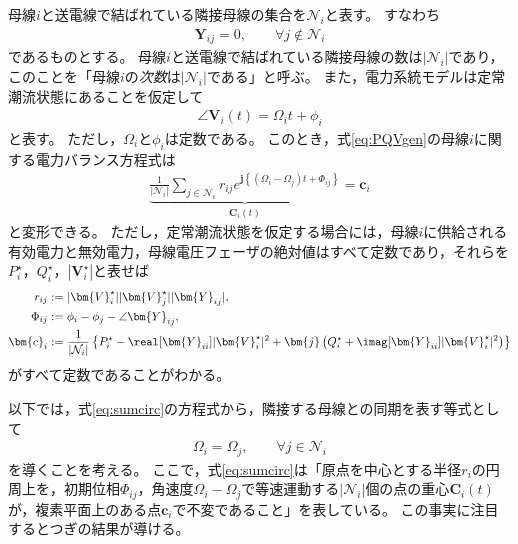 \documentclass[tombow,dvipdfmx]{corona-a5-1.1}
\begin{document}
母線$i$と送電線で結ばれている隣接母線の集合を$\mathcal{N}_i$と表す。
すなわち
\begin{align*}
\bm{Y}_{ij} = 0,\qquad \forall j \notin \mathcal{N}_i
\end{align*}
であるものとする。
母線$i$と送電線で結ばれている隣接母線の数は$|\mathcal{N}_i|$であり，このことを「母線$i$の\emph{次数}は$|\mathcal{N}_i|$である」と呼ぶ。
また，電力系統モデルは定常潮流状態にあることを仮定して
\begin{align*}
\angle \bm{V}_i (t) = \Omega_i t +\phi_i
\end{align*}
と表す。
ただし，$\Omega_i$と$\phi_i$は定数である。
このとき，式\ref{eq:PQVgen}の母線$i$に関する電力バランス方程式は
\begin{align}\label{eq:sumcirc}
\underbrace{
\frac{1}{|\mathcal{N}_i|}\sum_{j \in \mathcal{N}_i } 
r_{ij}
e^{\bm{j} 
\left\{
(\Omega_i - \Omega_j)t + 
\Phi_{ij}
\right\} }
}_{\bm{C}_i (t)}
= \bm{c}_i
\end{align}
と変形できる。
ただし，定常潮流状態を仮定する場合には，母線$i$に供給される有効電力と無効電力，母線電圧フェーザの絶対値はすべて定数であり，それらを$P_i^{\star}$，$Q_i^{\star}$，$|\bm{V}_i^{\star}|$と表せば
\begin{align*}
r_{ij} &:=|\bm{V}_i^{\star}| |\bm{V}_j^{\star}| |\bm{Y}_{ij}|, 
\\
\Phi_{ij} &:= \phi_i - \phi_j - \angle \bm{Y}_{ij},
\\
\bm{c}_i &:=  \frac{1}{|\mathcal{N}_i|}
\left\{
P_i^{\star} - \real[\bm{Y}_{ii}] |\bm{V}_i^{\star}|^2
+ \bm{j}
\left(
Q_i^{\star} + \imag [\bm{Y}_{ii}] |\bm{V}_i^{\star}|^2
\right)
\right\}
\end{align*}
がすべて定数であることがわかる。

以下では，式\ref{eq:sumcirc}の方程式から，隣接する母線との同期を表す等式として
\begin{align}\label{eq:alloms}
\Omega_i = \Omega_{j} 
,\qquad 
\forall j\in \mathcal{N}_i
\end{align}
を導くことを考える。
ここで，式\ref{eq:sumcirc}は「原点を中心とする半径$r_i$の円周上を，初期位相$\Phi_{ij}$，角速度$\Omega_i-\Omega_j$で等速運動する$|\mathcal{N}_i|$個の点の重心$\bm{C}_i (t)$が，複素平面上のある点$\bm{c}_i$で不変であること」を表している。
この事実に注目するとつぎの結果が導ける。
\end{document}
